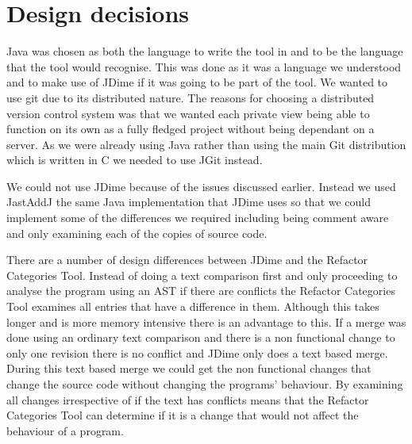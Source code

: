 
\section{Design decisions}
Java was chosen as both the language to write the tool in and to be the language that the tool would recognise.  This was done as it was a language we understood and to make use of JDime if it was going to be part of the tool.  We wanted to use git due to its distributed nature.  The reasons for choosing a distributed version control system was that we wanted each private view being able to function on its own as a fully fledged project without being dependant on a server.  As we were already using Java rather than using the main Git distribution which is written in C we needed to use JGit instead.

We could not use JDime because of the issues discussed earlier. Instead we used JastAddJ the same Java implementation that JDime uses so that we could implement some of the differences we required including being comment aware and only examining each of the copies of source code.

There are a number of design differences between JDime and the Refactor Categories Tool.
 Instead of doing a text comparison first and only proceeding to analyse the program using an AST if there are conflicts the Refactor Categories Tool examines all entries that have a difference in them.
Although this takes longer and is more memory intensive there is an advantage to this.  
If a merge was done using an ordinary text comparison and there is a non functional change to only one revision there is no conflict and JDime only does a text based merge.  
During this text based merge we could get the non functional changes that change the source code without changing the programs' behaviour. By examining all changes irrespective of if the text has conflicts means that the Refactor Categories Tool can determine if it is a change that would not affect the behaviour of a program.

